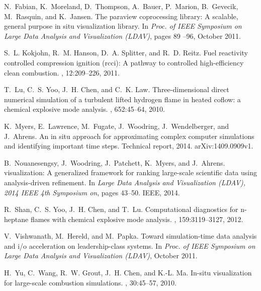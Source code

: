 \documentclass{sig-alternate}
\begin{document}
\begin{thebibliography}{10}
N.~Fabian, K.~Moreland, D.~Thompson, A.~Bauer, P.~Marion, B.~Gevecik,
  M.~Rasquin, and K.~Jansen.
\newblock The paraview coprocessing library: A scalable, general purpose in
  situ visualization library.
\newblock In {\em Proc. of IEEE Symposium on Large Data Analysis and
  Visualization (LDAV)}, pages 89 --96, October 2011.

S.~L. Kokjohn, R.~M. Hanson, D.~A. Splitter, and R.~D. Reitz.
\newblock Fuel reactivity controlled compression ignition (rcci): A pathway to
  controlled high-efficiency clean combustion.
, 12:209--226, 2011.

T.~Lu, C.~S. Yoo, J.~H. Chen, and C.~K. Law.
\newblock Three-dimensional direct numerical simulation of a turbulent lifted
  hydrogen flame in heated coflow: a chemical explosive mode analysis.
, 652:45--64, 2010.

K.~Myers, E.~Lawrence, M.~Fugate, J.~Woodring, J.~Wendelberger, and J.~Ahrens.
\newblock An in situ approach for approximating complex computer simulations
  and identifying important time steps.
\newblock Technical report, 2014.
\newblock arXiv:1409.0909v1.

B.~Nouanesengsy, J.~Woodring, J.~Patchett, K.~Myers, and J.~Ahrens.
 visualization: A generalized framework for ranking large-scale
  scientific data using analysis-driven refinement.
\newblock In {\em Large Data Analysis and Visualization (LDAV), 2014 IEEE 4th
  Symposium on}, pages 43--50. IEEE, 2014.

R.~Shan, C.~S. Yoo, J.~H. Chen, and T.~Lu.
\newblock Computational diagnostics for n-heptane flames with chemical
  explosive mode analysis.
, 159:3119--3127, 2012.

V.~Vishwanath, M.~Hereld, and M.~Papka.
\newblock Toward simulation-time data analysis and i/o acceleration on
  leadership-class systems.
\newblock In {\em Proc. of IEEE Symposium on Large Data Analysis and
  Visualization (LDAV)}, October 2011.

H.~Yu, C.~Wang, R.~W. Grout, J.~H. Chen, and K.-L. Ma.
\newblock In-situ visualization for large-scale combustion simulations.
, 30:45--57, 2010.

\end{thebibliography}
\end{document}
